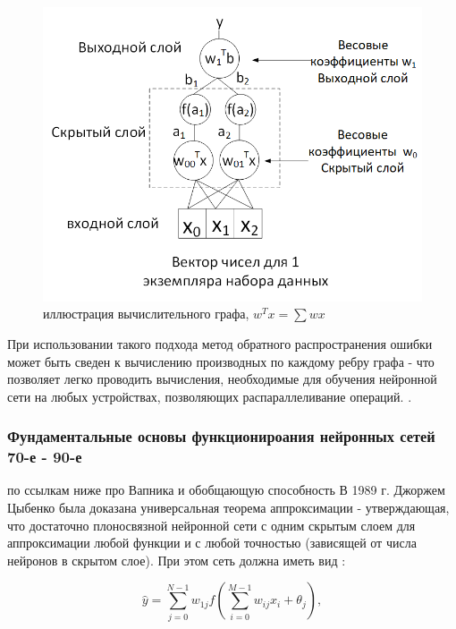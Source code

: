 \documentclass[12pt]{article}
\begin{document}
\begin{sloppypar}
 \begin{figure}[!h]
 	\begin{center}
 		\includegraphics[width=0.7\linewidth]{./figuresch1/comp_gpraph.png}
 		\caption{иллюстрация вычислительного графа, $w^Tx = \sum wx$}		
 		\label{ch1:fig:comp_gpraph}
 	\end{center}
 \end{figure}

При использовании такого подхода метод обратного распространения ошибки может быть сведен к вычислению производных по каждому ребру графа - что позволяет легко проводить вычисления, необходимые для обучения нейронной сети на любых устройствах, позволяющих распараллеливание операций. 
\cite{Nikolenko2017DL}. 

\subsubsection{Фундаментальные основы функционироания нейронных сетей 70-е - 90-е}
по ссылкам ниже про Вапника и обобщающую способность
В 1989 г. Джоржем Цыбенко была доказана универсальная теорема аппроксимации - утверждающая, что достаточно плоносвязной нейронной сети с одним скрытым слоем для аппроксимации любой функции  и с любой точностью (зависящей от числа нейронов в скрытом слое). При этом сеть должна иметь вид 
\cite{cybenko1989approximation}:

\begin{equation}
\label{ch1:eqn:Cybenko}
\hat y = \sum_{j=0}^{N-1} {w_{1j} f(\sum_{i=0}^{M-1} w_{ij} x_i + \theta_j) },
\end{equation}


\end{sloppypar}
\end{document}

